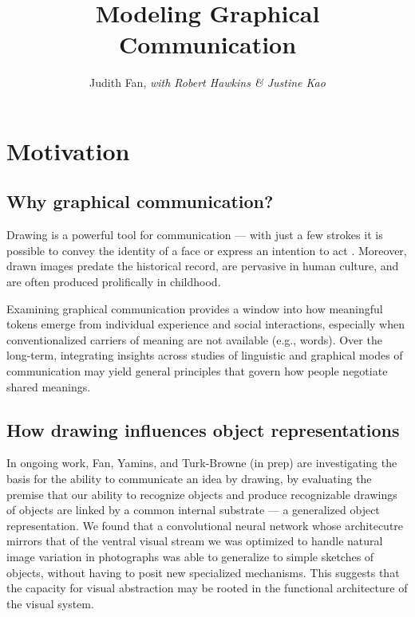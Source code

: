 \documentclass[12pt]{article}
\title{\textbf{Modeling Graphical Communication}}
\author{Judith Fan, \textit{with Robert Hawkins \& Justine Kao}}
\begin{document}
\maketitle %

\section{Motivation}

\subsection{Why graphical communication?}

Drawing is a powerful tool for communication --- with just a few strokes it is possible to convey the identity of a face \cite{bergmann2013impact} or express an intention to act \cite{Galantucci:2005uh}. Moreover, drawn images predate the historical record, are pervasive in human culture, and are often produced prolifically in childhood.

Examining graphical communication provides a window into how meaningful tokens emerge from individual experience and social interactions, especially when conventionalized carriers of meaning are not available (e.g., words). Over the long-term, integrating insights across studies of linguistic and graphical modes of communication may yield general principles that govern how people negotiate shared meanings.  

\subsection{How drawing influences object representations}

In ongoing work, Fan, Yamins, and Turk-Browne (in prep) are investigating the basis for the ability to communicate an idea by drawing, by evaluating the premise that our ability to recognize objects and produce recognizable drawings of objects are linked by a common internal substrate --- a generalized object representation. We found that a convolutional neural network whose architecutre mirrors that of the ventral visual stream we was optimized to handle natural image variation in photographs \cite{Yamins:2014gia} was able to generalize to simple sketches of objects, without having to posit new specialized mechanisms. This suggests that the capacity for visual abstraction may be rooted in the functional architecture of the visual system.
\end{document}
